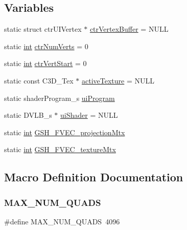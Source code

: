 \subsection*{Variables}
\begin{DoxyCompactItemize}
\item 
static struct ctr\+U\+I\+Vertex $\ast$ \mbox{\hyperlink{ctr-gpu_8c_a9831435e4e922adcbfe22ac4ee8a3701}{ctr\+Vertex\+Buffer}} = N\+U\+LL
\item 
static \mbox{\hyperlink{ioapi_8h_a787fa3cf048117ba7123753c1e74fcd6}{int}} \mbox{\hyperlink{ctr-gpu_8c_a6bbd95c477dc2a50a41467b5255957d1}{ctr\+Num\+Verts}} = 0
\item 
static \mbox{\hyperlink{ioapi_8h_a787fa3cf048117ba7123753c1e74fcd6}{int}} \mbox{\hyperlink{ctr-gpu_8c_ad57392cc189b8c0fa4fff1b0f7cb232e}{ctr\+Vert\+Start}} = 0
\item 
static const C3\+D\+\_\+\+Tex $\ast$ \mbox{\hyperlink{ctr-gpu_8c_a782c94764fe961bde3ce37e608d44698}{active\+Texture}} = N\+U\+LL
\item 
static shader\+Program\+\_\+s \mbox{\hyperlink{ctr-gpu_8c_a5f01efe6da2064bf5213b459efd0d49d}{ui\+Program}}
\item 
static D\+V\+L\+B\+\_\+s $\ast$ \mbox{\hyperlink{ctr-gpu_8c_a559627297d35d5650082f39f6be2343b}{ui\+Shader}} = N\+U\+LL
\item 
static \mbox{\hyperlink{ioapi_8h_a787fa3cf048117ba7123753c1e74fcd6}{int}} \mbox{\hyperlink{ctr-gpu_8c_ac69cd88507ed702953421cbe3a808b25}{G\+S\+H\+\_\+\+F\+V\+E\+C\+\_\+projection\+Mtx}}
\item 
static \mbox{\hyperlink{ioapi_8h_a787fa3cf048117ba7123753c1e74fcd6}{int}} \mbox{\hyperlink{ctr-gpu_8c_ac2b344449331d9dbce75cef892f5ab31}{G\+S\+H\+\_\+\+F\+V\+E\+C\+\_\+texture\+Mtx}}
\end{DoxyCompactItemize}


\subsection{Macro Definition Documentation}
\mbox{\label{ctr-gpu_8c_abc64108591f9acfd3372e681cbfc87e8}} 
\subsubsection{\texorpdfstring{M\+A\+X\+\_\+\+N\+U\+M\+\_\+\+Q\+U\+A\+DS}{MAX\_NUM\_QUADS}}
{\footnotesize\ttfamily \#define M\+A\+X\+\_\+\+N\+U\+M\+\_\+\+Q\+U\+A\+DS~4096}

